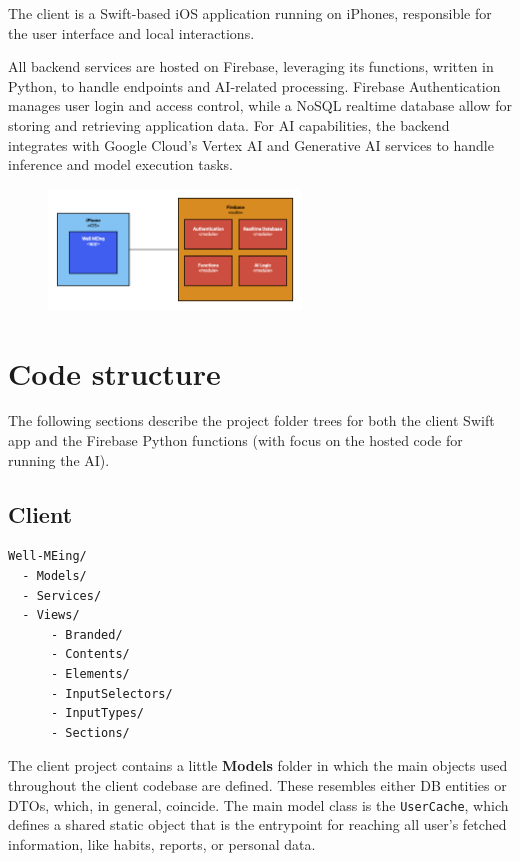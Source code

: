 \documentclass{article}
\newcommand{\newpar}[0]{\vspace{2mm}\noindent}
\begin{document}
The client is a Swift-based iOS application running on iPhones, responsible for the user interface and local interactions.

All backend services are hosted on Firebase, leveraging its functions, written in Python, to handle endpoints and AI-related processing.
Firebase Authentication manages user login and access control, while a NoSQL realtime database allow for storing and retrieving application data.
For AI capabilities, the backend integrates with Google Cloud's Vertex AI and Generative AI services to handle inference and model execution tasks.

\begin{figure}[H]
	\centering
	\includegraphics[width=0.6\textwidth]{images/deployment-view.png}
\end{figure}

\section{Code structure}

The following sections describe the project folder trees for both the client Swift app and the Firebase Python functions (with focus on the hosted code for running the AI).

\subsection{Client}

\begin{verbatim}
Well-MEing/
  - Models/
  - Services/
  - Views/
      - Branded/
      - Contents/
      - Elements/
      - InputSelectors/
      - InputTypes/
      - Sections/
\end{verbatim}

\newpar
The client project contains a little \textbf{Models} folder in which the main objects used throughout the client codebase are defined.
These resembles either DB entities or DTOs, which, in general, coincide.
The main model class is the \verb|UserCache|, which defines a shared static object that is the entrypoint for reaching all user's fetched information, like habits, reports, or personal data.
\end{document}
